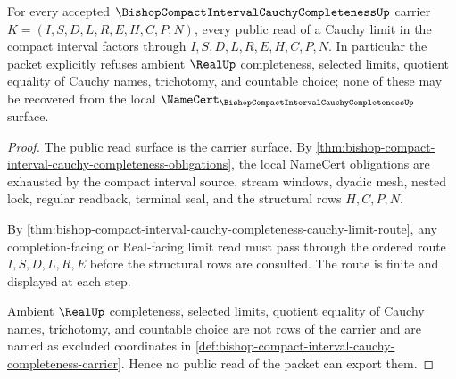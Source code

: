 \begin{theorem}
\label{thm:bishop-compact-interval-cauchy-completeness-nonescape}
For every accepted $\BishopCompactIntervalCauchyCompletenessUp$ carrier $K=(I,S,D,L,R,E,H,C,P,N)$, every public read of a Cauchy limit in the compact interval factors through $I,S,D,L,R,E,H,C,P,N$. In particular the packet explicitly refuses ambient $\RealUp$ completeness, selected limits, quotient equality of Cauchy names, trichotomy, and countable choice; none of these may be recovered from the local $\NameCert_{\BishopCompactIntervalCauchyCompletenessUp}$ surface.
\end{theorem}
\begin{proof}
The public read surface is the carrier surface. By \autoref{thm:bishop-compact-interval-cauchy-completeness-obligations}, the local NameCert obligations are exhausted by the compact interval source, stream windows, dyadic mesh, nested lock, regular readback, terminal seal, and the structural rows $H,C,P,N$.

By \autoref{thm:bishop-compact-interval-cauchy-completeness-cauchy-limit-route}, any completion-facing or Real-facing limit read must pass through the ordered route $I,S,D,L,R,E$ before the structural rows are consulted. The route is finite and displayed at each step.

Ambient $\RealUp$ completeness, selected limits, quotient equality of Cauchy names, trichotomy, and countable choice are not rows of the carrier and are named as excluded coordinates in \autoref{def:bishop-compact-interval-cauchy-completeness-carrier}. Hence no public read of the packet can export them.
\end{proof}



